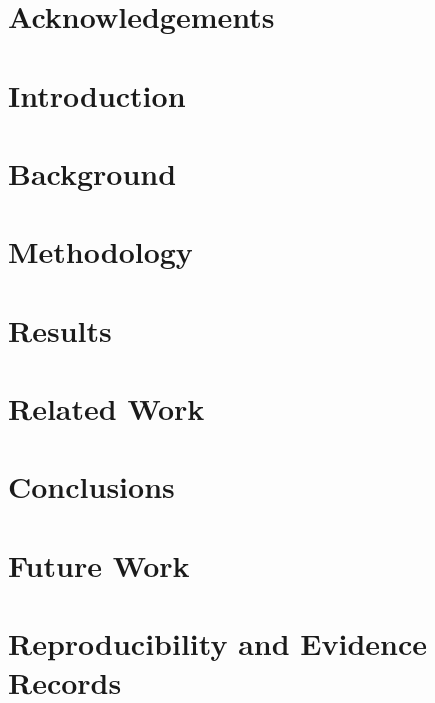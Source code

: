 \documentclass[12pt,twoside]{report}
\begin{document}


\chapter*{Acknowledgements}


{
  \hypersetup{linkcolor=black}
  \tableofcontents
}
\clearpage


\clearpage

\chapter{Introduction}


\chapter{Background}\label{ch:background}


\chapter{Methodology}\label{ch:methodology}


\chapter{Results}\label{ch:results}


\chapter{Related Work}\label{ch:relatedwork}


\chapter{Conclusions}\label{ch:conclusion}


\chapter{Future Work}\label{ch:futurework}


\printbibliography[heading=bibintoc]

\appendix
\chapter{Reproducibility and Evidence Records}\label{ch:appendices}

\end{document}
